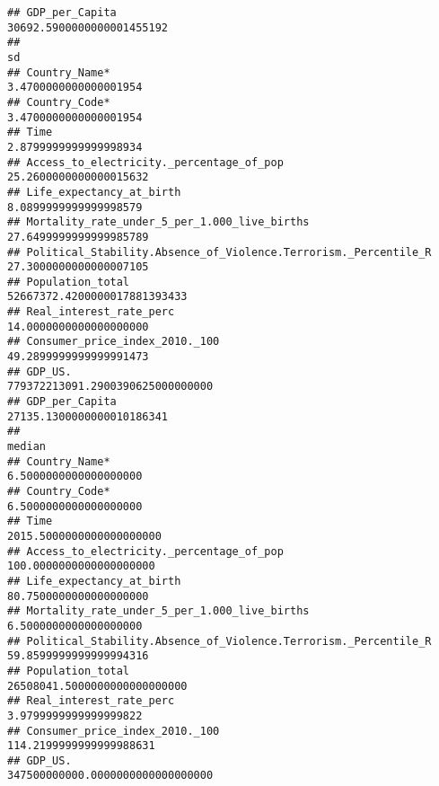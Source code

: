 \documentclass[
]{article}
\begin{document}
\begin{verbatim}
## GDP_per_Capita                                                         30692.5900000000001455192
##                                                                                               sd
## Country_Name*                                                              3.4700000000000001954
## Country_Code*                                                              3.4700000000000001954
## Time                                                                       2.8799999999999998934
## Access_to_electricity._percentage_of_pop                                  25.2600000000000015632
## Life_expectancy_at_birth                                                   8.0899999999999998579
## Mortality_rate_under_5_per_1.000_live_births                              27.6499999999999985789
## Political_Stability.Absence_of_Violence.Terrorism._Percentile_R           27.3000000000000007105
## Population_total                                                    52667372.4200000017881393433
## Real_interest_rate_perc                                                   14.0000000000000000000
## Consumer_price_index_2010._100                                            49.2899999999999991473
## GDP_US.                                                         779372213091.2900390625000000000
## GDP_per_Capita                                                         27135.1300000000010186341
##                                                                                           median
## Country_Name*                                                              6.5000000000000000000
## Country_Code*                                                              6.5000000000000000000
## Time                                                                    2015.5000000000000000000
## Access_to_electricity._percentage_of_pop                                 100.0000000000000000000
## Life_expectancy_at_birth                                                  80.7500000000000000000
## Mortality_rate_under_5_per_1.000_live_births                               6.5000000000000000000
## Political_Stability.Absence_of_Violence.Terrorism._Percentile_R           59.8599999999999994316
## Population_total                                                    26508041.5000000000000000000
## Real_interest_rate_perc                                                    3.9799999999999999822
## Consumer_price_index_2010._100                                           114.2199999999999988631
## GDP_US.                                                         347500000000.0000000000000000000

\end{verbatim}
\end{document}
